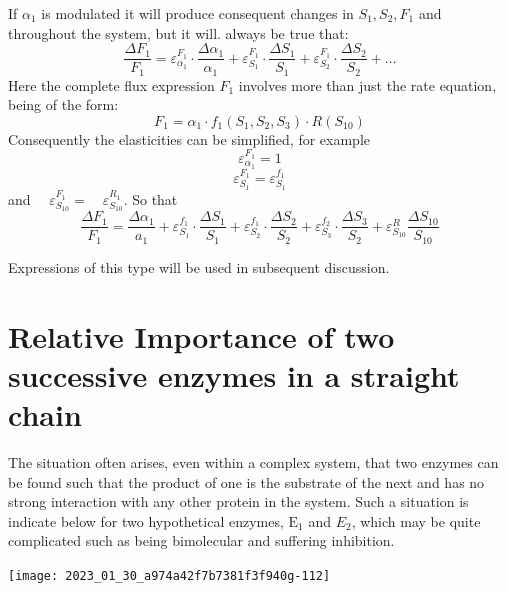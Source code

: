 If $\alpha_{1}$ is modulated it will produce consequent changes in $S_{1}, S_{2}, F_{1}$ and throughout the system, but it will. always be true that:
%
$$
\frac{\Delta F_{1}}{F_{1}} = \varepsilon^{F_1}_{\alpha_{1}} \cdot \frac{\Delta \alpha_{1}}{\alpha_{1}} + \varepsilon^{F_{1}}_{S_{1}} \cdot \frac{\Delta S_{1}}{S_{1}} + \varepsilon_{S_{2}}^{F_{1}} \cdot \frac{\Delta S_{2}}{S_{2}} + \ldots
$$
%
Here the complete flux expression $F_{1}$ involves more than just the rate equation, being of the form:
%
$$
F_{1}=\alpha_{1} \cdot f_{1}\left(S_{1}, S_{2}, S_{3}\right) \cdot R\left(S_{10}\right)
$$
%
Consequently the elasticities can be simplified, for example
%
$$
\varepsilon_{\alpha_{1}}^{F_{1}} = 1
$$
%
$$
\varepsilon_{S_{1}}^{F_{1}} = \varepsilon_{S_{1}}^{f_{1}}
$$
%
and $\quad \varepsilon_{S_{10}}^{F_{1}}=\quad \varepsilon^{R_{1}}_{S_{10}}$. So that
%
$$
\frac{\Delta F_{1}}{F_{1}}=\frac{\Delta \alpha_{1}}{a_{1}}+ \varepsilon_{S_{1}}^{f_{1}} \cdot \frac{\Delta S_{1}}{S_{1}} + \varepsilon_{S_{2}}^{f_{1}} \cdot \frac{\Delta S_{2}}{S_{2}}+ \varepsilon_{S_{3}}^{f_2} \cdot \frac{\Delta S_{3}}{S_{2}}+ \varepsilon_{S_{10}}^{R} \frac{\Delta S_{10}}{S_{10}}
$$

Expressions of this type will be used in subsequent discussion.

\section{Relative Importance of two successive enzymes in a straight chain}

The situation often arises, even within a complex system, that two enzymes can be found such that the product of one is the substrate of the next and has no strong interaction with any other protein in the system. Such a situation is indicate below for two hypothetical enzymes, $\mathrm{E}_{1}$ and $E_{2}$, which may be quite complicated such as being bimolecular and suffering inhibition.

\begin{center}
\texttt{[image: 2023\_01\_30\_a974a42f7b7381f3f940g-112]}
\end{center}

